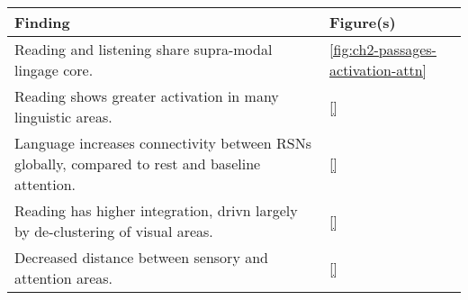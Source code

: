 \begin{tabular}{ll}
\toprule 
Finding & Figure(s) \\ 
\midrule 
Reading and listening share supra-modal lingage core.	& \ref{fig:ch2-passages-activation-attn} \\ 
Reading shows greater activation in many linguistic areas.	& \ref{} \\ 
Language increases connectivity between RSNs globally, compared to rest and baseline attention.	& \ref{} \\ 
Reading has higher integration, drivn largely by de-clustering of visual areas.	& \ref{}  \\ 
Decreased distance between sensory and attention areas.  &  \ref{} \\ 
\bottomrule 
\end{tabular}